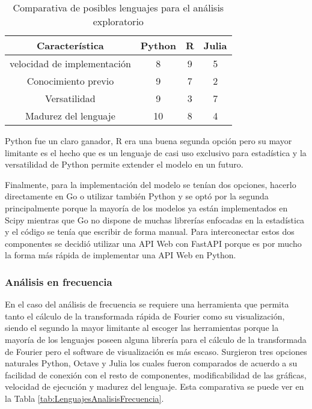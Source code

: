     \begin{table}[ht]
        \caption[Comparativa de posibles lenguajes para el análisis exploratorio]{Comparativa de posibles lenguajes para el análisis exploratorio}
        \label{tab:LenguajesAnalisisExploratorio}
        \begin{center}
            \vspace{0.3cm}
            \begin{tabular}{|c|c|c|c|}
                \hline
                Característica              & Python & R & Julia\\\hline
                \hline
                velocidad de implementación & 8     & 9     & 5 \\\hline
                Conocimiento previo         & 9     & 7     & 2 \\\hline
                Versatilidad              & 9     & 3     & 7 \\\hline
                Madurez del lenguaje        & 10    & 8     & 4 \\\hline
            \end{tabular}
        \end{center}
    \end{table}

    Python fue un claro ganador, R era una buena segunda opción pero su mayor
    limitante es el hecho que es un lenguaje de casi uso exclusivo para
    estadística y la versatilidad de Python  permite extender el modelo en un
    futuro.

    Finalmente, para la implementación del modelo se tenían dos opciones,
    hacerlo directamente en Go o utilizar también Python y se optó por la
    segunda principalmente porque la mayoría de los modelos ya están
    implementados en Scipy mientras que Go no dispone de muchas librerías
    enfocadas en la estadística y el código se tenía que escribir de forma
    manual. Para interconectar estos dos componentes se decidió utilizar una
    API Web con FastAPI porque es por mucho la forma más rápida de implementar
    una API Web en Python.

    \subsubsection{Análisis en frecuencia}
    En el caso del análisis de frecuencia se requiere una herramienta que
    permita tanto el cálculo de la transformada rápida de Fourier como su
    visualización, siendo el segundo la mayor limitante al escoger
    las herramientas porque la mayoría de los lenguajes poseen alguna librería
    para el cálculo de la transformada de Fourier pero el software de
    visualización es más escaso. Surgieron tres opciones naturales Python,
    Octave y Julia los cuales fueron comparados de acuerdo a su facilidad de
    conexión con el resto de componentes, modificabilidad de las gráficas,
    velocidad de ejecución y madurez del lenguaje. Esta comparativa se puede
    ver en la Tabla \ref{tab:LenguajesAnalisisFrecuencia}.

